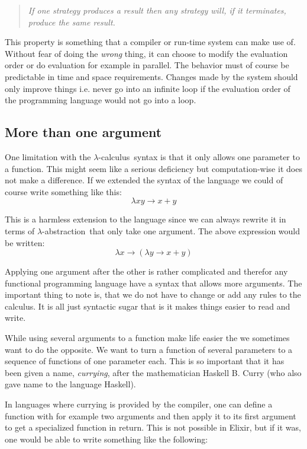 \documentclass[a4paper,11pt]{article}
\newcommand{\lamc}[0]{$\lambda$-calculus}
\newcommand{\lama}[0]{$\lambda$-abstraction}
\begin{document}
\begin{quotation} {\em If one strategy produces a result then any
    strategy will, if it terminates, produce the same result. }
\end{quotation}

This property is something that a compiler or run-time system can make
use of. Without fear of doing the {\em wrong} thing, it can choose to
modify the evaluation order or do evaluation for example in
parallel. The behavior must of course be predictable in time and
space requirements. Changes made by the system should only improve
things i.e. never go into an infinite loop if the evaluation order of
the programming language would not go into a loop.


\subsection{More than one argument}

One limitation with the \lamc\ syntax is that it only allows one
parameter to a function. This might seem like a serious deficiency but
computation-wise it does not make a difference. If we extended the
syntax of the language we could of course write something like this:
$$\lambda x y \rightarrow x + y$$

This is a harmless extension to the language since we can always
rewrite it in terms of \lama\ that only take one argument. The above
expression would be written:
$$\lambda x \rightarrow (\lambda y \rightarrow x + y )$$

Applying one argument after the other is rather complicated and
therefor any functional programming language have a syntax that allows
more arguments. The important thing to note is, that we do not have to
change or add any rules to the calculus. It is all just syntactic sugar
that is it makes things easier to read and write.

While using several arguments to a function make life easier the
we sometimes want to do the opposite. We want to
turn a function of several parameters to a sequence of functions of
one parameter each. This is so important that it has been given a
name, {\em currying}, after the mathematician Haskell B. Curry (who also
gave name to the language Haskell).

In languages where currying is provided by the compiler, one can define
a function with for example two arguments and then apply it to its
first argument to get a specialized function in return. This is not
possible in Elixir, but if it was, one would be able to write something
like the following:
\end{document}
